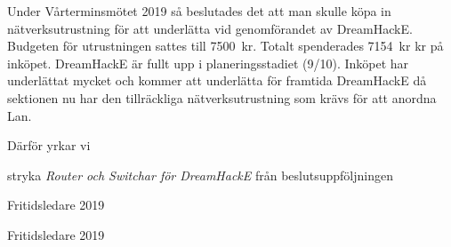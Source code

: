 \documentclass[../_main/handlingar.tex]{subfiles}
\begin{document}

    Under Vårterminsmötet 2019 så beslutades det att man skulle köpa in nätverksutrustning för att underlätta vid genomförandet av DreamHackE. Budgeten för utrustningen sattes till \SI{7500}{kr}. Totalt spenderades \SI{7154}{kr} kr på inköpet. DreamHackE är fullt upp i planeringsstadiet (9/10). Inköpet har underlättat mycket och kommer att underlätta för framtida DreamHackE då sektionen nu har den tillräckliga nätverksutrustning som krävs för att anordna Lan. 

    Därför yrkar vi
\begin{attsatser}
    \att stryka \emph{Router och Switchar för DreamHackE} från beslutsuppföljningen
\end{attsatser}

\begin{signatures}{2}
    \signature{Vincent Palmer}{Fritidsledare 2019}
    \signature{Marcus Oknelid}{Fritidsledare 2019}
\end{signatures}
\end{document}
